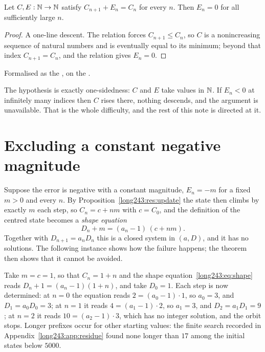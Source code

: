 \documentclass[11pt]{article}
\begin{document}
\begin{theorem}[descent]\label{long243:res:descent}
Let $C,E:\mathbb{N}\to\mathbb{N}$ satisfy $C_{n+1}+E_n=C_n$ for every $n$.  Then $E_n=0$ for
all sufficiently large $n$.
\end{theorem}

\begin{proof}
A one-line descent.  The relation forces $C_{n+1}\le C_n$, so $C$ is a nonincreasing sequence of
natural numbers and is eventually equal to its minimum; beyond that index
$C_{n+1}=C_n$, and the relation gives $E_n=0$.
\end{proof}

\noindent Formalised as the
, on the
.

The hypothesis is exactly one-sidedness: $C$ and $E$ take values in $\mathbb{N}$.  If
$E_n<0$ at infinitely many indices then $C$ rises there, nothing descends, and
the argument is unavailable.  That is the whole difficulty, and the rest of
this note is directed at it.

\section{Excluding a constant negative magnitude}\label{long243:sec:constant}

Suppose the error is negative with a constant magnitude, $E_n=-m$ for a fixed
$m>0$ and every $n$.  By
Proposition~\ref{long243:res:update} the state then climbs by exactly $m$ each step,
so $C_n=c+nm$ with $c=C_0$, and the definition of the centred state becomes a
\emph{shape equation}
\[
 D_n+m=(a_n-1)\,(c+nm) .
\tag{5.1}\label{long243:eq:shape}
\]
Together with $D_{n+1}=a_nD_n$ this is a closed system in $(a,D)$, and it has
no solutions.  The following instance shows how the failure happens; the
theorem then shows that it cannot be avoided.

\begin{example}\label{long243:ex:shape}
Take $m=c=1$, so that $C_n=1+n$ and the shape equation~\eqref{long243:eq:shape} reads
$D_n+1=(a_n-1)(1+n)$, and take $D_0=1$.  Each step is now determined: at $n=0$
the equation reads $2=(a_0-1)\cdot1$, so $a_0=3$, and $D_1=a_0D_0=3$; at $n=1$
it reads $4=(a_1-1)\cdot2$, so $a_1=3$, and $D_2=a_1D_1=9$; at $n=2$ it reads
$10=(a_2-1)\cdot3$, which has no integer solution, and the orbit stops.
Longer prefixes occur for other starting values: the finite search recorded in
Appendix~\ref{long243:app:residue} found none longer than $17$ among the initial
states below $5000$.
\end{example}
\end{document}
